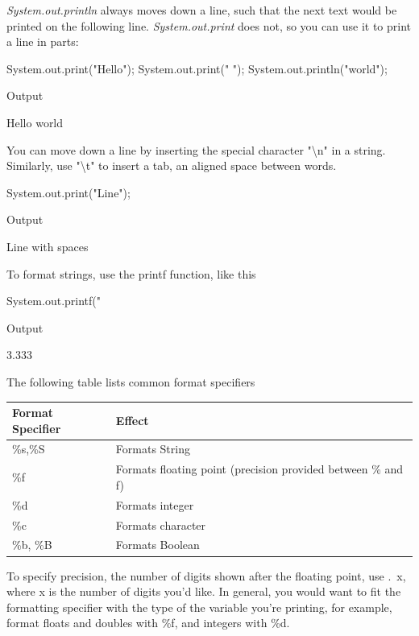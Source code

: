 \textit{System.out.println} always moves down a line, such that the next text would be printed on the following line. \textit{System.out.print} does not, so you can use it to print a line in parts:

\begin{code}
System.out.print("Hello");
System.out.print(" ");
System.out.println("world");
\end{code}

Output
\begin{code}
Hello world
\end{code}

You can move down a line by inserting the special character "\textbackslash n" in a  string. Similarly, use "\textbackslash t" to insert a tab, an aligned space between words.

\begin{code}
System.out.print("Line\twith\tspaces\n");
\end{code}

Output
\begin{code}
Line	with	spaces
\end{code}

To format strings, use the printf function, like this

\begin{code}
System.out.printf("%
\end{code}

Output
\begin{code}
3.333
\end{code}

The following table lists common format specifiers

\begin{tabular}{|l|l|}
\hline
Format Specifier & Effect\\
\hline
\%s,\%S & Formats String\\
\%f & Formats floating point (precision provided between \% and f)\\
\%d & Formats integer\\
\%c & Formats character\\
\%b, \%B & Formats Boolean\\
\hline
\end{tabular}

To specify precision, the number of digits shown after the floating point, use .\ x, where x is the number of digits you'd like. In general, you would want to fit the formatting specifier with the type of the variable you're printing, for example, format floats and doubles with \%f, and integers with \%d.

